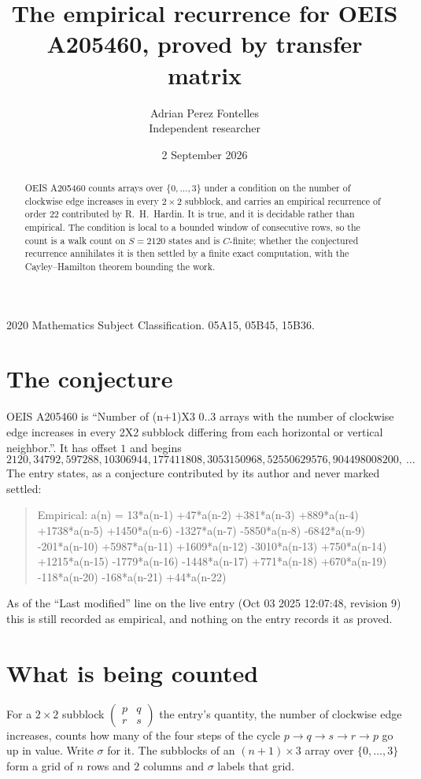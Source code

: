 \documentclass[11pt,a4paper]{article}
\title{The empirical recurrence for OEIS A205460, proved by transfer matrix}
\author{Adrian Perez Fontelles\\ \small Independent researcher}
\date{2 September 2026}
\theoremstyle{plain}
\theoremstyle{definition}
\begin{document}
\maketitle

\begin{abstract}
OEIS A205460 counts arrays over $\{0,\dots,3\}$ under a condition on the number of clockwise edge increases
in every $2\times2$ subblock, and carries an empirical recurrence of order $22$ contributed by
R.~H.~Hardin. It is true, and it is decidable rather than empirical. The condition is local to
a bounded window of consecutive rows, so the count is a walk count on $S=2120$ states and is
$C$-finite; whether the conjectured recurrence annihilates it is then settled by a finite exact
computation, with the Cayley--Hamilton theorem bounding the work.
\end{abstract}

\noindent\small 2020 Mathematics Subject Classification. 05A15, 05B45, 15B36.\normalsize

\section{The conjecture}

OEIS A205460 is ``Number of (n+1)X3 0..3 arrays with the number of clockwise edge increases in every 2X2 subblock differing from each horizontal or vertical neighbor.''. It has offset $1$ and begins
\[
2120, 34792, 597288, 10306944, 177411808, 3053150968, 52550629576, 904498008200,\ \dots
\]
The entry states, as a conjecture contributed by its author and never marked settled:
\begin{quote}
Empirical: a(n) = 13*a(n-1) +47*a(n-2) +381*a(n-3) +889*a(n-4) +1738*a(n-5) +1450*a(n-6) -1327*a(n-7) -5850*a(n-8) -6842*a(n-9) -201*a(n-10) +5987*a(n-11) +1609*a(n-12) -3010*a(n-13) +750*a(n-14) +1215*a(n-15) -1779*a(n-16) -1448*a(n-17) +771*a(n-18) +670*a(n-19) -118*a(n-20) -168*a(n-21) +44*a(n-22)
\end{quote}
As of the ``Last modified'' line on the live entry (Oct 03 2025 12:07:48, revision 9) this is still
recorded as empirical, and nothing on the entry records it as proved.

\section{What is being counted}

For a $2\times2$ subblock $\begin{pmatrix}p&q\\r&s\end{pmatrix}$ the
entry's quantity, the number of clockwise edge increases, counts how many of the four steps of the cycle $p\to q\to s\to r\to p$ go up in value. Write $\sigma$ for it. The subblocks of an
$(n+1)\times3$ array over $\{0,\dots,3\}$ form a grid of $n$ rows and $2$
columns and $\sigma$ labels that grid.
\end{document}
